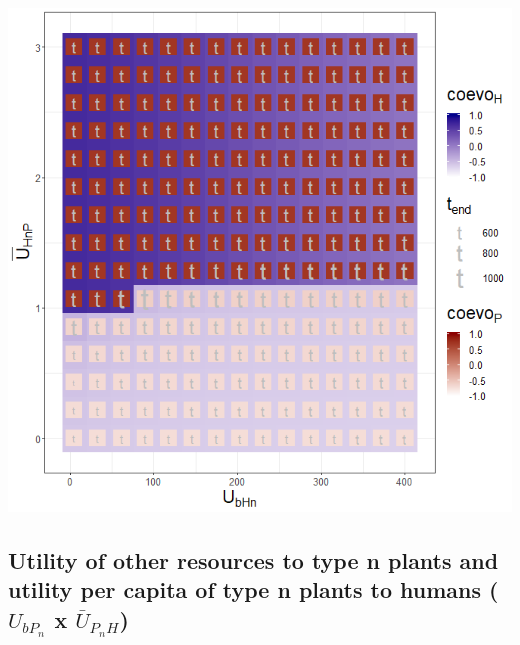 \documentclass[]{book}
\begin{document}
\includegraphics[width=1\linewidth]{plots/3_twoPar-U.bHn-mU.HnP_plot}

\newpage

\hypertarget{utility-of-other-resources-to-type-n-plants-and-utility-per-capita-of-type-n-plants-to-humans-u_bp_n-x-baru_p_nh}{%
\subsection{\texorpdfstring{Utility of other resources to type n plants and utility per capita of type n plants to humans (\(U_{bP_{n}}\) x \(\bar{U}_{P_{n}H}\))}{Utility of other resources to type n plants and utility per capita of type n plants to humans (U\_\{bP\_\{n\}\} x \textbackslash{}bar\{U\}\_\{P\_\{n\}H\})}}\label{utility-of-other-resources-to-type-n-plants-and-utility-per-capita-of-type-n-plants-to-humans-u_bp_n-x-baru_p_nh}}
\end{document}
